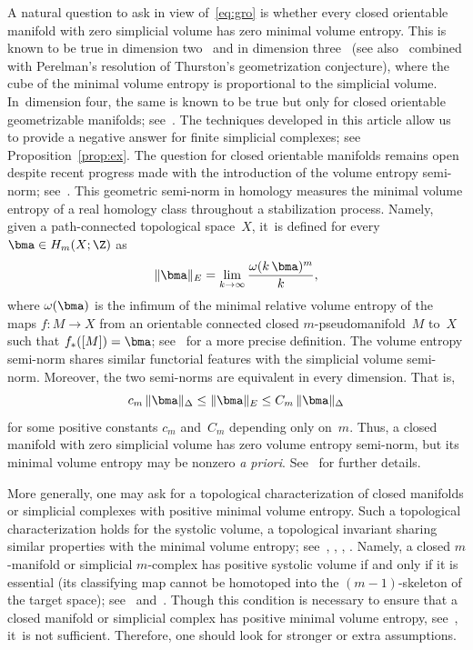 A natural question to ask in view of~\eqref{eq:gro} is whether every closed orientable manifold with zero simplicial volume has zero minimal volume entropy.
This is known to be true in dimension two~\cite{katok} and in dimension three~\cite{pieroni} (see also~\cite{AP03} combined with Perelman's resolution of Thurston's geometrization conjecture), where the cube of the minimal volume entropy is proportional to the simplicial volume. In~dimension four, the same is known to be true but only for closed orientable geometrizable manifolds; see~\cite{SS09}.
The techniques developed in this article allow us to provide a negative answer for finite simplicial complexes; see Proposition~\ref{prop:ex}.
The question for closed orientable manifolds remains open despite recent progress made with the introduction of the volume entropy semi-norm; see~\cite{BS}.
This geometric semi-norm in homology measures the minimal volume entropy of a real homology class throughout a stabilization process.
Namely, given a path-connected topological space~$X$, it~is defined for every $\bma \in H_m(X;\Z)$ as
\begin{equation*}%
\Vert \bma \Vert_E = \lim_{k \to \infty} \frac{\omega(k \, \bma)^m}{k},
\end{equation*}
where $\omega(\bma)$ is the infimum of the minimal relative volume entropy of the maps \hbox{$f:M \to X$} from an orientable connected closed $m$\nobreakdash-pseudomanifold~$M$ to~$X$ such that $f_*([M])=\bma$; see~\cite{BS} for a more precise definition.
The volume entropy semi-norm shares similar functorial features with the simplicial volume semi-norm.
Moreover, the two semi-norms are equivalent in every dimension.
That is,
\begin{equation} \label{eq:BS}
c_m \, \Vert \bma \Vert_\Delta \leq \Vert \bma \Vert_E \leq C_m \, \Vert \bma \Vert_\Delta
\end{equation}
for some positive constants $c_m$ and~$C_m$ depending only on~$m$.
Thus, a closed manifold with zero simplicial volume has zero volume entropy semi-norm, but its minimal volume entropy may be nonzero \emph{a priori}.
See~\cite{BS} for further details.

More generally, one may ask for a topological characterization of closed manifolds or simplicial complexes with positive minimal volume entropy.
Such a topological characterization holds for the systolic volume, a topological invariant sharing similar properties with the minimal volume entropy; see~\cite{B93}, \cite{B06}, \cite{B08}, \cite{Brunnbauer08}.
Namely, a closed $m$\nobreakdash-manifold or simplicial $m$\nobreakdash-complex has positive systolic volume if and only if it is essential (\ie its classifying map cannot be homotoped into the $(m-1)$-skeleton of the target space); see~\cite{gro83} and~\cite{B93}.
Though this condition is necessary to ensure that a closed manifold or simplicial complex has positive minimal volume entropy, see~\cite{B93}, it~is not sufficient.
Therefore, one should look for stronger or extra assumptions.

